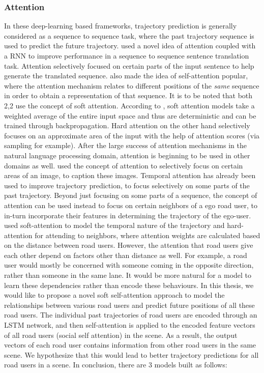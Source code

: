 \documentclass{article}
\begin{document}
\subsubsection{Attention}
In these deep-learning based frameworks, trajectory prediction is generally considered as a sequence to sequence task, where the past trajectory sequence is used to predict the future trajectory.   \cite{bahdanau_neural_2016} used a novel idea of attention coupled with a RNN to improve performance in a sequence to sequence sentence translation task. Attention selectively focused on certain parts of the input sentence to help generate the translated sequence. \cite{vaswani_attention_2017} also made the idea of self-attention popular, where the attention mechanism relates to different positions of the \textit{same} sequence in order to obtain a representation of that sequence. It is to be noted that both 2,2 use the concept of soft attention. According to \cite{sharma_action_2016}, soft attention models take a weighted average of the entire input space and thus are deterministic and can be trained through backpropagation. Hard attention on the other hand selectively focuses on an approximate area of the input with the help of attention scores (via sampling for example).  After the large success of attention mechanisms in the natural language processing domain, attention is beginning to be used in other domains as well. \cite{xu_show_2016} used the concept of attention to selectively focus on certain areas of an image, to caption these images. Temporal attention has already been used to 
improve trajectory prediction, to focus selectively on some parts of the past trajectory. Beyond just focusing on some parts of a sequence, the concept of attention can be used instead to focus on certain neighbors of a ego road user, to in-turn incorporate their features in determining the trajectory of the ego-user. \cite{fernando_soft_2017-2} used soft-attention to model the temporal nature of the trajectory and hard-attention for attending to neighbors, where attention weights are calculated based on the distance between road users. However, the attention that road users give each other depend on factors other than distance as well. For example, a road user would mostly be concerned with someone coming in the opposite direction, rather than someone in the same lane.  It would be more natural for a model to learn these dependencies rather than encode these behaviours. In this thesis, we would like to propose a novel soft self-attention approach to model the relationships between various road users and predict future positions of all these road users. The individual past trajectories of road users are encoded through an LSTM network, and then self-attention is applied to the encoded feature vectors of all road users (social self attention) in the scene. As a result, the output vectors of each road user contains information from other road users in the same scene. We hypothesize that this would lead to better trajectory predictions for all road users in a scene. In conclusion, there are 3 models built as follows:
\end{document}
